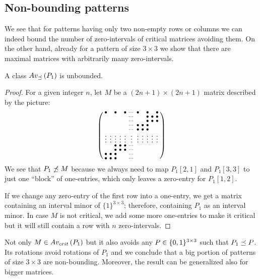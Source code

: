 \subsection{Non-bounding patterns}
\label{subsec:nonbound}
We see that for patterns having only two non-empty rows or columns we can indeed bound the number of zero-intervals of critical matrices avoiding them. On the other hand, already for a pattern of size $3\times3$ we show that there are maximal matrices with arbitrarily many zero-intervals.

\begin{lemma}
\label{lemma:manyints}
A class $Av_{\preceq}\left(P_1\right)$ is unbounded.
\end{lemma}
\begin{proof} For a given integer $n$, let $M$ be a $(2n+1)\times(2n+1)$ matrix described by the picture:
$$\left(\begin{smallmatrix}	\bullet& &\bullet& &\bullet&\cdots&\bullet& &\bullet& &\bullet\\
		 & & & & &\cdots& & &\bullet&\bullet&\bullet\\
		 & & & & &\cdots& & &\bullet&\bullet&\bullet\\
		 & & & & &\cdots&\bullet&\bullet&\bullet& & \\
		 & & & & &\cdots&\bullet&\bullet&\bullet& & \\
		\vdots&\vdots&\vdots&\vdots&\vdots&\vdots&\vdots&\vdots&\vdots&\vdots&\vdots\\
		 & &\bullet&\bullet&\bullet&\cdots& & & & & \\
		 & &\bullet&\bullet&\bullet&\cdots& & & & & \\
		\bullet&\bullet&\bullet& & &\cdots& & & & & \\
		\bullet&\bullet&\bullet& & &\cdots& & & & & \\
		 \end{smallmatrix}\right)$$
We see that $P_1\not\preceq M$ because we always need to map $P_1[2,1]$ and $P_1[3,3]$ to just one ``block'' of one-entries, which only leaves a zero-entry for $P_1[1,2]$.

If we change any zero-entry of the first row into a one-entry, we get a matrix containing an interval minor of $\{1\}^{3\times3}$; therefore, containing $P_1$ as an interval minor. In case $M$ is not critical, we add some more one-entries to make it critical but it will still contain a row with $n$ zero-intervals.
\end{proof}

Not only $M\in Av_{crit}\left(P_1\right)$ but it also avoids any $P\in\{0,1\}^{3\times3}$ such that $P_1\preceq P$. Its rotations avoid rotations of $P_1$ and we conclude that a big portion of patterns of size $3\times3$ are non-bounding. Moreover, the result can be generalized also for bigger matrices.

